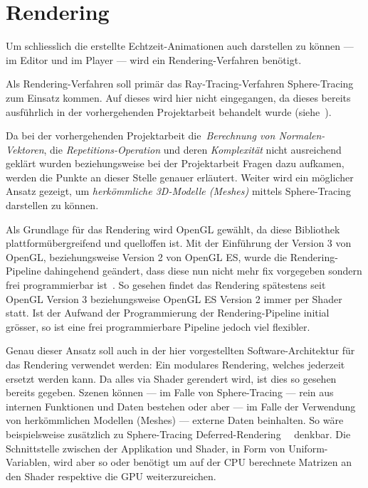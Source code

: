 
\chapter{Rendering}
\label{chap:rendering}


Um schliesslich die erstellte Echtzeit-Animationen auch darstellen zu können
--- im Editor und im Player --- wird ein Rendering-Verfahren benötigt.

Als Rendering-Verfahren soll primär das Ray-Tracing-Verfahren Sphere-Tracing
zum Einsatz kommen. Auf dieses wird hier nicht eingegangen, da dieses
bereits ausführlich in der vorhergehenden Projektarbeit behandelt wurde
(siehe~\cite{osterwalder_sven_volume_2016}).

Da bei der vorhergehenden Projektarbeit die~\textit{Berechnung von
    Normalen-Vektoren}, die \textit{Repetitions-Operation} und deren
\textit{Komplexität} nicht ausreichend geklärt wurden beziehungsweise bei der
Projektarbeit Fragen dazu aufkamen, werden die Punkte an dieser Stelle genauer
erläutert. Weiter wird ein möglicher Ansatz gezeigt, um \textit{herkömmliche
    3D-Modelle (Meshes)} mittels Sphere-Tracing darstellen zu können.

Als Grundlage für das Rendering wird OpenGL gewählt, da diese Bibliothek
plattformübergreifend und quelloffen ist. Mit der Einführung der Version 3 von
OpenGL, beziehungsweise Version 2 von OpenGL ES, wurde die Rendering-Pipeline
dahingehend geändert, dass diese nun nicht mehr fix vorgegeben sondern frei
programmierbar
ist\cite{opengl_foundation_fixed_2015}~\cite{opengl_foundation_rendering_2015}.
So gesehen findet das Rendering spätestens seit OpenGL Version 3
beziehungsweise OpenGL ES Version 2 immer per Shader statt. Ist der Aufwand der 
Programmierung der Rendering-Pipeline initial grösser, so ist eine frei
programmierbare Pipeline jedoch viel flexibler.

Genau dieser Ansatz soll auch in der hier vorgestellten Software-Architektur
für das Rendering verwendet werden: Ein modulares Rendering, welches jederzeit
ersetzt werden kann. Da alles via Shader gerendert wird, ist dies so gesehen
bereits gegeben. Szenen können --- im Falle von Sphere-Tracing --- rein aus
internen Funktionen und Daten bestehen oder aber --- im Falle der Verwendung
von herkömmlichen Modellen (Meshes) --- externe Daten beinhalten. So wäre
beispielsweise zusätzlich zu Sphere-Tracing
Deferred-Rendering~~\parencite{saito_comprehensible_1990}
denkbar. Die Schnittstelle zwischen der Applikation und Shader, in Form von
Uniform-Variablen, wird aber so oder benötigt um auf der CPU berechnete
Matrizen an den Shader respektive die GPU weiterzureichen.





